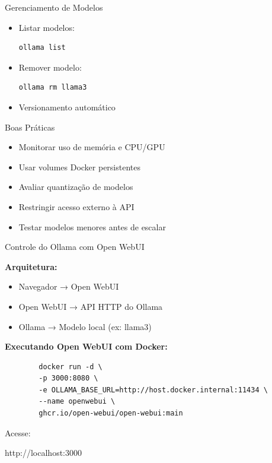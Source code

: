 \documentclass{beamer}
\begin{document}
\begin{frame}{Gerenciamento de Modelos}
    \begin{itemize}
        \item Listar modelos:
\begin{verbatim}
ollama list
\end{verbatim}
        \item Remover modelo:
\begin{verbatim}
ollama rm llama3
\end{verbatim}
        \item Versionamento automático
    \end{itemize}
\end{frame}

\begin{frame}{Boas Práticas}
    \begin{itemize}
        \item Monitorar uso de memória e CPU/GPU
        \item Usar volumes Docker persistentes
        \item Avaliar quantização de modelos
        \item Restringir acesso externo à API
        \item Testar modelos menores antes de escalar
    \end{itemize}
\end{frame}

\begin{frame}{Controle do Ollama com Open WebUI}
    
    \textbf{Arquitetura:}
    \begin{itemize}
        \item Navegador → Open WebUI
        \item Open WebUI → API HTTP do Ollama
        \item Ollama → Modelo local (ex: llama3)
    \end{itemize}
    
    \vspace{0.3cm}
    
    \textbf{Executando Open WebUI com Docker:}
    
    \begin{verbatim}
        docker run -d \
        -p 3000:8080 \
        -e OLLAMA_BASE_URL=http://host.docker.internal:11434 \
        --name openwebui \
        ghcr.io/open-webui/open-webui:main
    \end{verbatim}
    
    \vspace{0.3cm}
    
    Acesse:
    \begin{center}
        http://localhost:3000
    \end{center}
    
\end{frame}
\end{document}
